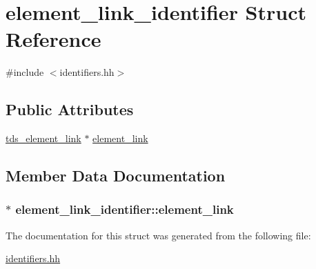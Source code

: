 \hypertarget{structelement__link__identifier}{\section{element\-\_\-link\-\_\-identifier Struct Reference}
\label{structelement__link__identifier}
}


{\ttfamily \#include $<$identifiers.\-hh$>$}

\subsection*{Public Attributes}
\begin{DoxyCompactItemize}
\item 
\hyperlink{classtds__element__link}{tds\-\_\-element\-\_\-link} $\ast$ \hyperlink{structelement__link__identifier_a6cbf33d61c44c54e1a21f0329f453134}{element\-\_\-link}
\end{DoxyCompactItemize}


\subsection{Member Data Documentation}
\hypertarget{structelement__link__identifier_a6cbf33d61c44c54e1a21f0329f453134}{
\subsubsection[{element\-\_\-link}]{$\ast$ element\-\_\-link\-\_\-identifier\-::element\-\_\-link}}\label{structelement__link__identifier_a6cbf33d61c44c54e1a21f0329f453134}


The documentation for this struct was generated from the following file\-:\begin{DoxyCompactItemize}
\item 
\hyperlink{identifiers_8hh}{identifiers.\-hh}\end{DoxyCompactItemize}
